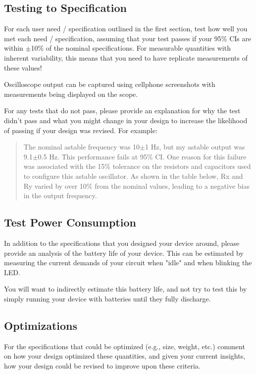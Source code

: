 \documentclass[10pt]{article}
\begin{document}
\subsection{Testing to Specification}
For each user need / specification outlined in the first section, test how well
you met each need / specification, assuming that your test passes if your 95\%
CIs are within $\pm$10\% of the nominal specifications.  For measurable
quantities with inherent variability, this means that you need to have replicate
measurements of these values!

Oscilloscope output can be captured using cellphone screenshots with
measurements being displayed on the scope.

For any tests that do not pass, please provide an explanation for why the test
didn't pass and what you might change in your design to increase the likelihood
of passing if your design was revised.  For example:

\begin{quote}
    The nominal astable frequency was 10$\pm$1 Hz, but my astable output was
    9.1$\pm$0.5 Hz.  This performance fails at 95\% CI.  One reason for this
    failure was associated with the 15\% tolerance on the resistors and
    capacitors used to configure this astable oscillator.  As shown in the table
    below, Rx and Ry varied by over 10\% from the nominal values, leading to a
    negative bias in the output frequency.
\end{quote}

\subsection{Test Power Consumption}
In addition to the specifications that you designed your device around, please
provide an analysis of the battery life of your device.  This can be estimated
by measuring the current demands of your circuit when "idle" and when blinking
the LED.

You will want to indirectly estimate this battery life, and not try to test this
by simply running your device with batteries until they fully discharge.

\subsection{Optimizations}
For the specifications that could be optimized (e.g., size, weight, etc.) comment
on how your design optimized these quantities, and given your current insights,
how your design could be revised to improve upon these criteria.
\end{document}
